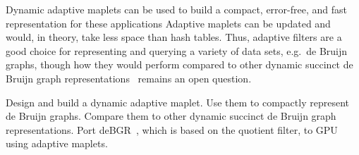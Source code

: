 Dynamic adaptive maplets can be used to build a compact, error-free, and fast representation for these applications
Adaptive maplets can be updated and  would, in theory, take less space than hash tables. Thus, adaptive filters are a good choice for representing and querying a variety of data sets, e.g.~de Bruijn graphs, though how they would perform compared to other dynamic succinct de Bruijn graph representations~\cite{DBLP:journals/bioinformatics/AlipanahiKPSB21} remains an open question.


\begin{rproblem}\label{rprob:dyn-apt-filter}
Design and build a dynamic adaptive maplet.  Use them to compactly represent de Bruijn graphs.  Compare them to other dynamic succinct de Bruijn graph representations. Port deBGR~\cite{PandeyBeJo17b}, which is based on the quotient filter, to GPU using adaptive maplets.
\end{rproblem}






